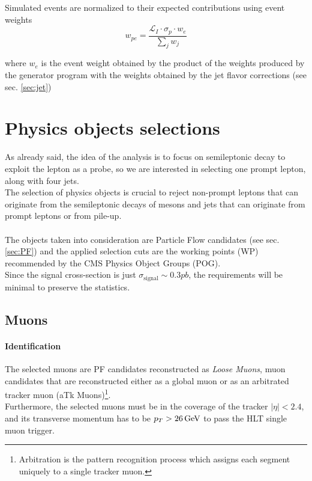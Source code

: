Simulated events are normalized to
their expected contributions using event weights 
\begin{equation}
    w_{pe}=\frac{\mathcal{L}_I \cdot \sigma_p \cdot w_{e} }{\sum_j w_{j}}
\end{equation}

where $w_{e}$ is the event weight obtained by the product of the weights produced by the generator program with the weights obtained by the jet flavor corrections (see sec. \ref{sec:jet})   

\section{Physics objects selections}
As already said, the idea of the analysis is to focus on semileptonic decay to exploit the lepton as a probe, so we are interested in selecting one prompt lepton, along with four jets.\\
The selection of physics objects is crucial to reject non-prompt leptons that can originate from the semileptonic decays of mesons and jets that can originate from prompt leptons or from pile-up.\\
\\
The objects taken into consideration are Particle Flow candidates (see sec. \ref{sec:PF}) and the applied selection cuts are the working points (WP) recommended by the CMS Physics Object Groups (POG).\\
Since the signal cross-section is just $\sigma_{\text{signal}}\sim 0.3 pb$, the requirements will be minimal to preserve the statistics. 
\subsection{Muons}
\paragraph*{Identification}
The selected muons are PF candidates reconstructed as \emph{Loose Muons}, \ie muon candidates that are reconstructed either as a global muon or as an arbitrated tracker muon (aTk Muons)\footnote{Arbitration is the pattern recognition process which assigns each segment uniquely to a single tracker muon.}.\\
Furthermore, the selected muons must be in the coverage of the tracker $|\eta|<2.4$, and its transverse momentum has to be $p_T>26{\,\text{Ge\hspace{-.08em}V}}$ to pass the HLT single muon trigger. 
